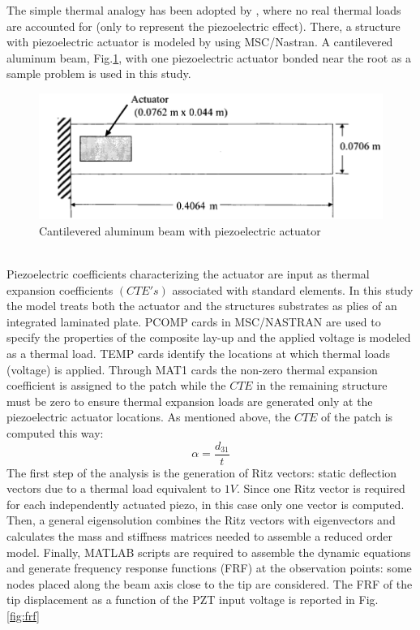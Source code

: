 \documentclass[twocolumn,a4paper,10pt,english]{article}
\begin{document}
        The simple thermal analogy has been adopted by \cite{c2}, where no real thermal loads are accounted for (only to represent the piezoelectric effect). There, a structure with piezoelectric actuator is modeled by using MSC/Nastran.	A cantilevered aluminum beam, Fig.\ref{fig:beam}, with one piezoelectric actuator bonded near the root as a sample problem is used in this study. 
        \begin{figure}[htp]
        	\centering
        	\includegraphics[width=0.6\linewidth]{images/nasa.png}
        	\caption{Cantilevered aluminum beam with piezoelectric actuator}
        	\label{fig:beam}
        \end{figure}\\
        Piezoelectric coefficients characterizing the actuator are input as thermal expansion coefficients $(CTE's)$ associated with standard elements. In this study the model treats both the actuator and the structures substrates as plies of an integrated laminated plate. PCOMP cards in MSC/NASTRAN are used to specify the properties of the composite lay-up and the applied voltage is modeled as a thermal load. TEMP cards identify the locations at which thermal loads (voltage) is applied.
	    Through MAT1 cards the 	non-zero thermal expansion coefficient is assigned to the patch while the $CTE$ in the remaining structure must be zero to ensure thermal expansion loads are generated only at the piezoelectric actuator locations. As mentioned above, the $CTE$ of the patch is computed this way:
	    \begin{equation}
	    	\alpha=\frac{d_{31}}{t}
	    \end{equation}
	    The first step of the analysis is the generation of Ritz vectors: static deflection vectors due to a thermal load equivalent to $1V$. Since one Ritz vector is required for each independently actuated piezo, in this case only one vector is computed.
	    Then, a general eigensolution combines the Ritz vectors with eigenvectors and
	    calculates the mass and stiffness matrices needed to assemble a reduced order model. Finally, MATLAB scripts are required to assemble the dynamic equations and generate frequency response functions (FRF) at the observation points: some nodes placed along the beam axis close to the tip are considered. The FRF of the tip displacement as a function of the PZT input voltage is reported in Fig. \ref{fig:frf}
\end{document}
